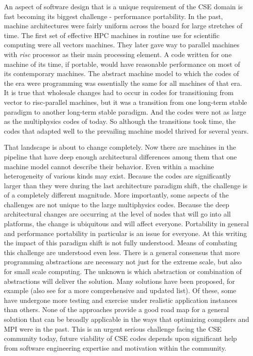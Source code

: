 \label{sec:future}

An aspect of software design that is a unique requirement of
the CSE domain is fast becoming its biggest challenge - performance
portability. In the past, machine architectures were fairly uniform
across the board for large stretches of time. The first set of
effective HPC machines in routine use for scientific computing were
all vectors machines. They later gave way to parallel machines with
{\em risc} processor as their main processing element. A code written
for one machine of its time, if portable, would have reasonable
performance on most of its contemporary machines. The abstract machine
model to which the codes of the era were programming was essentially
the same for all machines of that era. It is true that wholesale changes had to occur
in codes for transitioning from vector to risc-parallel machines, but
it was a transition from one long-term stable paradigm to another
long-term stable paradigm. And the codes were not as large as the
multiphysics codes of today. So although the transitions took time, the
codes that adapted well to the prevailing machine model thrived for
several years.  

That landscape is about to change completely. Now there are machines
in the pipeline that have deep enough architectural differences among
them that one machine model cannot describe their behavior. Even
within a machine heterogeneity of various kinds may exist. Because
the codes are significantly larger than they were during the last
architecture paradigm shift, the challenge is of a
completely different magnitude. More importantly, some aspects of the
challenges are not unique to the large multiphysics codes. Because the
deep architectural changes are occurring at the level of nodes that
will go into all platforms, the change is ubiquitous and will
affect everyone. Portability in general and performance
portability in particular is an issue for everyone. At this writing
the impact of this paradigm shift is not fully understood. Means of
combating this challenge are understood even less. There is a general
consensus that more programming abstractions are necessary not just
for the extreme scale, but also for small scale computing. The unknown
is which abstraction or combination of abstractions will deliver the
solution. Many solutions have been proposed, for example \cite{PADAL14} (also
see \cite{IDEAS} for a more comprehensive and updated
list). Of these, some have undergone more testing and exercise under
realistic application instances than others. None of the approaches
provide a good road map for a general solution that can be broadly
applicable in the ways that optimizing compilers and MPI were
in the past. This is an urgent serious challenge facing the CSE
community today, future viability of CSE codes depends upon
significant help from software engineering expertise and motivation
within the community. 


